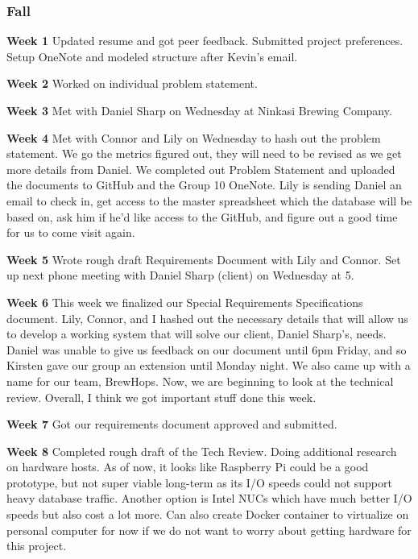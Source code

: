 \subsubsection{Fall}
\hfill\break
\noindent\medskip\textbf{Week 1}
Updated resume and got peer feedback.
Submitted project preferences.
Setup OneNote and modeled structure after Kevin's email.

\noindent\medskip\textbf{Week 2}
Worked on individual problem statement.

\noindent\medskip\textbf{Week 3}
Met with Daniel Sharp on Wednesday at Ninkasi Brewing Company.

\noindent\medskip\textbf{Week 4}
Met with Connor and Lily on Wednesday to hash out the problem statement. We go the metrics figured out, they will need to be revised as we get more details from Daniel.
We completed out Problem Statement and uploaded the documents to GitHub and the Group 10 OneNote.
Lily is sending Daniel an email to check in, get access to the master spreadsheet which the database will be based on, ask him if he'd like access to the GitHub, and figure out a good time for us to come visit again.

\noindent\medskip\textbf{Week 5}
Wrote rough draft Requirements Document with Lily and Connor. Set up next phone meeting with Daniel Sharp (client) on Wednesday at 5.

\noindent\medskip\textbf{Week 6}
This week we finalized our Special Requirements Specifications document.
Lily, Connor, and I hashed out the necessary details that will allow us to develop a working system that will solve our client, Daniel Sharp's, needs.
Daniel was unable to give us feedback on our document until 6pm Friday, and so Kirsten gave our group an extension until Monday night.
We also came up with a name for our team, BrewHops.
Now, we are beginning to look at the technical review.
Overall, I think we got important stuff done this week.

\noindent\medskip\textbf{Week 7}
Got our requirements document approved and submitted.

\noindent\medskip\textbf{Week 8}
Completed rough draft of the Tech Review.
Doing additional research on hardware hosts.
As of now, it looks like Raspberry Pi could be a good prototype, but not super viable long-term as its I/O speeds could not support heavy database traffic.
Another option is Intel NUCs which have much better I/O speeds but also cost a lot more.
Can also create Docker container to virtualize on personal computer for now if we do not want to worry about getting hardware for this project.

